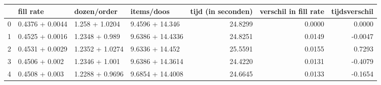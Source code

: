 \begin{tabular}{llllrrr}
\toprule
{} &        fill rate &      dozen/order &        items/doos &  tijd (in seconden) &  verschil in fill rate &  tijdsverschil \\
\midrule
0 &  0.4376 + 0.0044 &   1.258 + 1.0204 &   9.4596 + 14.346 &             24.8299 &                 0.0000 &         0.0000 \\
1 &  0.4525 + 0.0016 &   1.2348 + 0.989 &  9.6386 + 14.4336 &             24.8251 &                 0.0149 &        -0.0047 \\
2 &  0.4531 + 0.0029 &  1.2352 + 1.0274 &   9.6336 + 14.452 &             25.5591 &                 0.0155 &         0.7293 \\
3 &   0.4506 + 0.002 &   1.2346 + 1.001 &  9.6386 + 14.3614 &             24.4220 &                 0.0131 &        -0.4079 \\
4 &   0.4508 + 0.003 &  1.2288 + 0.9696 &  9.6854 + 14.4008 &             24.6645 &                 0.0133 &        -0.1654 \\
\bottomrule
\end{tabular}
